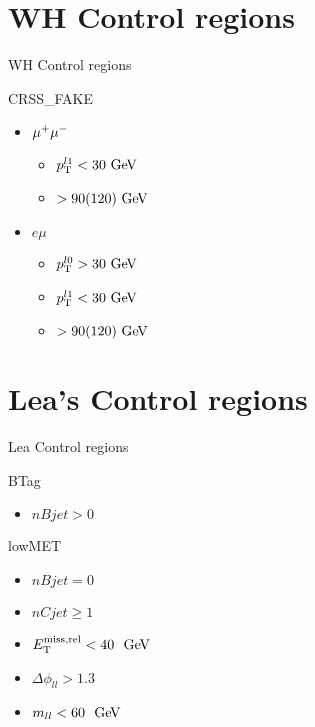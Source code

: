 \documentclass[10pt]{beamer}
\begin{document}
\section{WH Control regions}
\begin{frame}{WH Control regions}

  \begin{block}{CRSS\_FAKE}
    \begin{itemize}    
    \item $\mathrm{\mu^+ \mu^-}$
      \begin{itemize}
      \item $\pT^{l1}<30\GeV$
      \item \mljj$>90(120)\GeV$
      \end{itemize}
    \item $e\mu$
      \begin{itemize}
      \item $\pT^{l0}>30\GeV$
      \item $\pT^{l1}<30\GeV$
      \item \mljj$>90(120)\GeV$
      \end{itemize}
    \end{itemize}
  \end{block}

\end{frame}


\section{Lea's Control regions}
\begin{frame}{Lea Control regions}

  \begin{block}{BTag}
    \begin{itemize}    
    \item $nBjet>0$
    \end{itemize}
  \end{block}
  
  \begin{block}{lowMET}
    \begin{itemize}    
    \item $nBjet=0$
    \item $nCjet\ge 1$
    \item $\METrel<40~\GeV$
    \item $\Delta\phi_{ll}>1.3$
    \item $m_{ll}<60~\GeV$
    \end{itemize}
  \end{block}
 
\end{frame}
\end{document}
